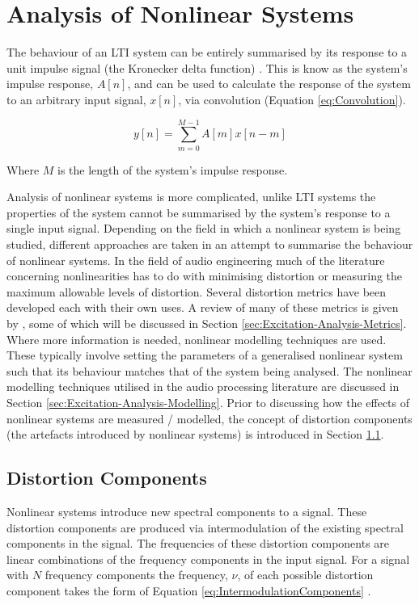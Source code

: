 \section{Analysis of Nonlinear Systems}
\label{sec:Excitation-AnalysisOfNonlinearSystems}
	The behaviour of an LTI system can be entirely summarised by its response to a unit impulse signal (the Kronecker
	delta function) \citep{phillips2007signals}. This is know as the system's impulse response, $A[n]$, and can be used
	to calculate the response of the system to an arbitrary input signal, $x[n]$, via convolution (Equation
	\ref{eq:Convolution}).

	\begin{equation}
		y[n] = \sum_{m = 0}^{M - 1} A[m]x[n-m]
		\label{eq:Convolution}
	\end{equation}

	Where $M$ is the length of the system's impulse response.
	
	Analysis of nonlinear systems is more complicated, unlike LTI systems the properties of the system cannot be
	summarised by the system's response to a single input signal. Depending on the field in which a nonlinear system is
	being studied, different approaches are taken in an attempt to summarise the behaviour of nonlinear systems. In the
	field of audio engineering much of the literature concerning nonlinearities has to do with minimising distortion or
	measuring the maximum allowable levels of distortion. Several distortion metrics have been developed each with
	their own uses. A review of many of these metrics is given by \citet{voishvillo2006assessment}, some of which will
	be discussed in Section \ref{sec:Excitation-Analysis-Metrics}.  Where more information is needed, nonlinear
	modelling techniques are used.  These typically involve setting the parameters of a generalised nonlinear system
	such that its behaviour matches that of the system being analysed. The nonlinear modelling techniques utilised in
	the audio processing literature are discussed in Section \ref{sec:Excitation-Analysis-Modelling}. Prior to
	discussing how the effects of nonlinear systems are measured / modelled, the concept of distortion components (the
	artefacts introduced by nonlinear systems) is introduced in Section \ref{sec:Excitation-Analysis-Components}.

	\subsection{Distortion Components}
	\label{sec:Excitation-Analysis-Components}
		Nonlinear systems introduce new spectral components to a signal. These distortion components are produced
		via intermodulation of the existing spectral components in the signal. The frequencies of these distortion
		components are linear combinations of the frequency components in the input signal. For a signal with $N$
		frequency components the frequency, $\nu$, of each possible distortion component takes the form of Equation
		\ref{eq:IntermodulationComponents} \citep{hulick2005solid}.

